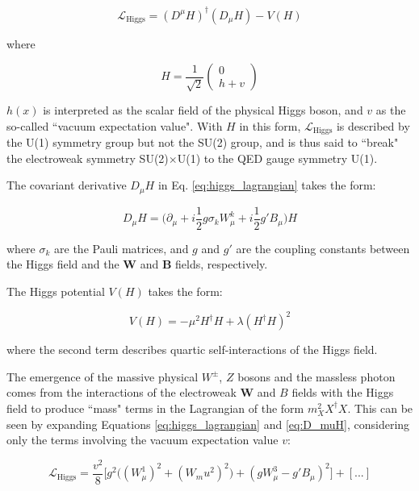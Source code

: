 \begin{equation}
\label{eq:higgs_lagrangian}
\mathcal{L}_\text{Higgs} = (D^\mu H)^\dagger(D_\mu H) - V(H)
\end{equation}

\noindent where

\begin{equation}
H = \frac{1}{\sqrt{2}}
\begin{pmatrix}
0 \\
h+v
\end{pmatrix}
\end{equation}

 \(h(x)\) is interpreted as the scalar field of the physical Higgs boson, and \(v\) as the so-called ``vacuum expectation value". With \(H\) in this form, \(\mathcal{L}_\text{Higgs}\) is described by the U(1) symmetry group but not the SU(2) group, and is thus said to ``break" the electroweak symmetry SU(2)\(\times\)U(1) to the QED gauge symmetry U(1).

The covariant derivative \(D_\mu H\) in Eq. \ref{eq:higgs_lagrangian} takes the form:

\begin{equation}
\label{eq:D_muH}
D_\mu H = \big(\partial_\mu + i\frac{1}{2}g\sigma_k W^k_\mu+i\frac{1}{2}g'B_\mu\big)H
\end{equation}

\noindent where \(\sigma_k\) are the Pauli matrices, and \(g\) and \(g'\) are the coupling constants between the Higgs field and the \(\boldsymbol{W}\) and \(\boldsymbol{B}\) fields, respectively.

The Higgs potential \(V(H)\) takes the form:

\begin{equation}
V(H) = -\mu^2H^\dagger H + \lambda(H^\dagger H)^2
\end{equation}

\noindent where the second term describes quartic self-interactions of the Higgs field.

The emergence of the massive physical \(W^\pm\), \(Z\) bosons and the massless photon comes from the interactions of the electroweak \(\boldsymbol{W}\) and \(B\) fields with the Higgs field to produce ``mass" terms in the Lagrangian of the form \(m_X^2X^\dagger X\). This can be seen by expanding Equations \ref{eq:higgs_lagrangian} and  \ref{eq:D_muH}, considering only the terms involving the vacuum expectation value \(v\):

\begin{equation}
\label{eq:higgs_expanded}
\mathcal{L}_\text{Higgs} = \frac{v^2}{8}\Big[g^2\big((W^1_\mu)^2+(W_mu^2)^2\big) + (gW^3_\mu-g'B_\mu)^2\Big] + [...]
\end{equation}

